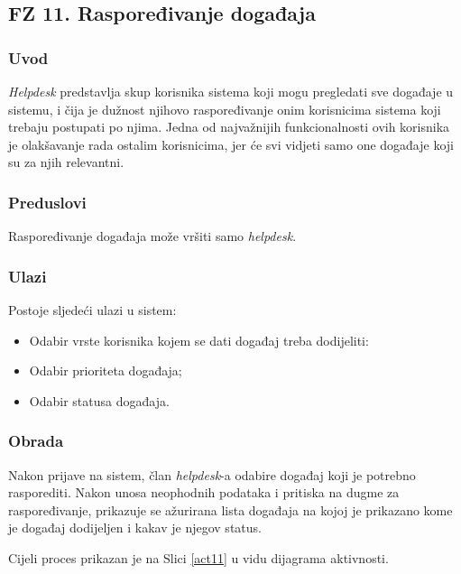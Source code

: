 \documentclass[12pt,a4paper]{article}
\begin{document}
\subsection{FZ 11. Raspoređivanje događaja}

\subsubsection{Uvod}

\textit{Helpdesk} predstavlja skup korisnika sistema koji mogu pregledati sve događaje u sistemu, i čija je dužnost njihovo raspoređivanje onim korisnicima sistema koji trebaju postupati po njima. Jedna od najvažnijih funkcionalnosti ovih korisnika je olakšavanje rada ostalim korisnicima, jer će svi vidjeti samo one događaje koji su za njih relevantni.

\subsubsection{Preduslovi}

Raspoređivanje događaja može vršiti samo \textit{helpdesk}.

\subsubsection{Ulazi}

Postoje sljedeći ulazi u sistem:

\begin{itemize}
\item Odabir vrste korisnika kojem se dati događaj treba dodijeliti:
\item Odabir prioriteta događaja;
\item Odabir statusa događaja.
\end{itemize}

\subsubsection{Obrada}

Nakon prijave na sistem, član \textit{helpdesk}-a odabire događaj koji je potrebno rasporediti. Nakon unosa neophodnih podataka i pritiska na dugme za raspoređivanje, prikazuje se ažurirana lista događaja na kojoj je prikazano kome je događaj dodijeljen i kakav je njegov status.

Cijeli proces prikazan je na Slici \ref{act11} u vidu dijagrama aktivnosti.
\end{document}
